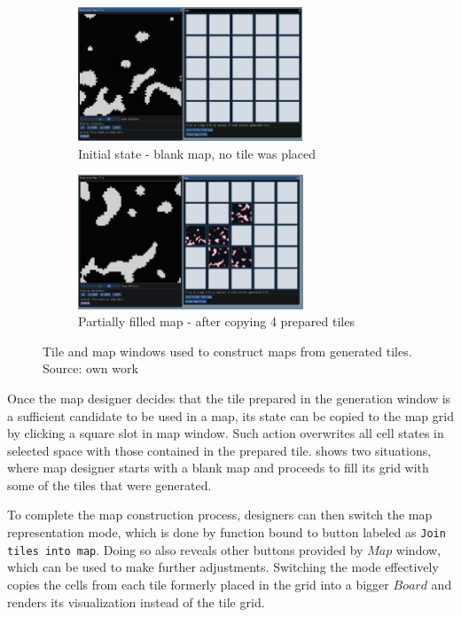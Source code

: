 \documentclass[12pt]{report}
\begin{document}
\begin{figure}[H]
	\centering
	\begin{subfigure}[t]{0.9\textwidth}
		\centering
		\includegraphics[height=4cm]{images/mapnotiles}
		\caption{Initial state - blank map, no tile was placed} 
	\end{subfigure}  
	\begin{subfigure}[t]{0.9\textwidth}
		\centering
		\includegraphics[height=4cm]{images/map4tiles}
		\caption{Partially filled map - after copying 4 prepared tiles} 
	\end{subfigure} 
	\caption{Tile and map windows used to construct maps from generated tiles. Source: own work}
	\label{fig:map_merging}
\end{figure}

Once the map designer decides that the tile prepared in the generation window is a sufficient candidate to be used in a map, its state can be copied to the map grid by clicking a square slot in map window. Such action overwrites all cell states in selected space with those contained in the prepared tile.  shows two situations, where map designer starts with a blank map and proceeds to fill its grid with some of the tiles that were generated.

To complete the map construction process, designers can then switch the map representation mode, which is done by function bound to button labeled as \texttt{Join tiles into map}. Doing so also reveals other buttons provided by $Map$ window, which can be used to make further adjustments. Switching the mode effectively copies the cells from each tile formerly placed in the grid into a bigger $Board$ and renders its visualization instead of the tile grid.
\end{document}
